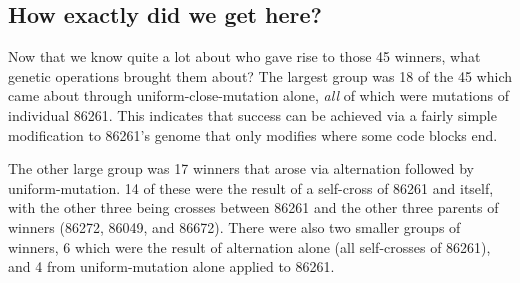 


\subsection{How exactly did we get here?}
\label{sec:howDidWeGetHere}

Now that we know quite a lot about who gave rise to those 45 winners, what genetic operations
brought them about? The largest group was 18 of the 45 which came about through 
uniform-close-mutation alone, \emph{all} of which were mutations of individual 86261. This indicates
that success can be achieved via a fairly simple modification to 86261's genome that only modifies 
where some code blocks end.

The other large group was 17 winners that arose via alternation followed by uniform-mutation. 14 of
these were the result of a self-cross of 86261 and itself, with the other three being crosses between
86261 and the other three parents of winners (86272, 86049, and 86672). There were also two smaller
groups of winners, 6 which were the result of alternation alone (all self-crosses of 86261), and 4
from uniform-mutation alone applied to 86261.

